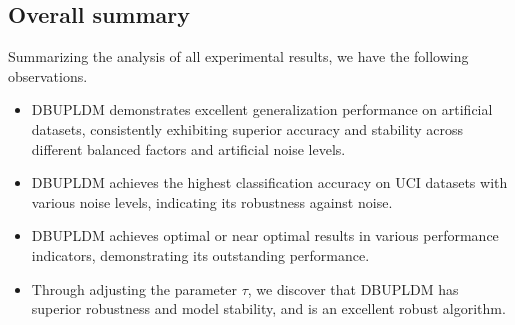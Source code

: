 \documentclass[a4paper]{cas-sc}
\begin{document}
\subsection{Overall summary}
Summarizing the analysis of all experimental results, we have the following observations.
\begin{itemize}
\item[$\bullet$] DBUPLDM demonstrates excellent generalization performance on artificial datasets, consistently exhibiting superior accuracy and stability across different balanced factors and artificial noise levels.
\item[$\bullet$] DBUPLDM achieves the highest classification accuracy on UCI datasets with various noise levels, indicating its robustness against noise.
\item[$\bullet$] DBUPLDM achieves optimal or near optimal results in various performance indicators, demonstrating its outstanding performance.





\item[$\bullet$] Through adjusting the parameter $\tau$, we discover that DBUPLDM has superior robustness and model stability, and is an excellent robust algorithm.




\end{itemize}
\end{document}
